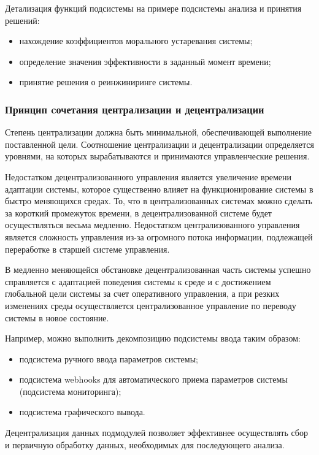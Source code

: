 Детализация функций подсистемы на примере подсистемы анализа и принятия решений:
\begin{itemize}
    \item нахождение коэффициентов морального устаревания системы;
    \item определение значения эффективности в заданный момент времени;
    \item принятие решения о реинжиниринге системы.
\end{itemize}

\subsubsection{Принцип cочетания централизации и децентрализации}
Степень централизации должна быть минимальной, обеспечивающей выполнение поставленной цели. 
Соотношение централизации и децентрализации определяется уровнями, на которых вырабатываются и принимаются управленческие решения.

Недостатком децентрализованного управления является увеличение времени адаптации системы, которое существенно влияет на функционирование системы в быстро меняющихся средах. 
То, что в централизованных системах можно сделать за короткий промежуток времени, в децентрализованной системе будет осуществляться весьма медленно. 
Недостатком централизованного управления является сложность управления из-за огромного потока информации, подлежащей переработке в старшей системе управления. 

В медленно меняющейся обстановке децентрализованная часть системы успешно справляется с адаптацией поведения системы к среде и с достижением глобальной цели системы за счет оперативного управления, а при резких изменениях среды осуществляется централизованное управление по переводу системы в новое состояние.

Например, можно выполнить декомпозицию подсистемы ввода таким образом:
\begin{itemize}
    \item подсистема ручного ввода параметров системы;
    \item подсистема webhooks для автоматического приема параметров системы (подсистема мониторинга);
    \item подсистема графического вывода.
\end{itemize}

Децентрализация данных подмодулей позволяет эффективнее осуществлять сбор и первичную обработку данных, необходимых для последующего анализа.

